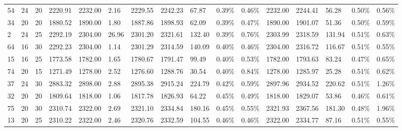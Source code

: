 \begin{longtable}{l|ll|lll|lllll|lllll}
   54 & 24                         & 20                         & 2220.91                   & 2232.00     & 2.16                & 2229.55 & 2242.23 & 67.87  & 0.39\%  & 0.46\% & 2232.00 & 2244.41 & 56.28  & 0.50\%  & 0.56\% \\
   34 & 20                         & 20                         & 1880.52                   & 1890.00     & 1.80                & 1887.86 & 1898.93 & 62.09  & 0.39\%  & 0.47\% & 1890.00 & 1901.07 & 51.36  & 0.50\%  & 0.59\% \\
   2  & 24                         & 25                         & 2292.19                   & 2304.00     & 26.96               & 2301.20 & 2321.61 & 132.40 & 0.39\%  & 0.76\% & 2303.99 & 2318.59 & 131.94 & 0.51\%  & 0.63\% \\
   64 & 16                         & 30                         & 2292.23                   & 2304.00     & 1.14                & 2301.29 & 2314.59 & 140.09 & 0.40\%  & 0.46\% & 2304.00 & 2316.72 & 116.67 & 0.51\%  & 0.55\% \\
   15 & 16                         & 25                         & 1773.58                   & 1782.00     & 1.65                & 1780.67 & 1791.47 & 99.49  & 0.40\%  & 0.53\% & 1782.00 & 1793.63 & 83.24  & 0.47\%  & 0.65\% \\
   74 & 20                         & 15                         & 1271.49                   & 1278.00     & 2.52                & 1276.60 & 1288.76 & 30.54  & 0.40\%  & 0.84\% & 1278.00 & 1285.97 & 25.28  & 0.51\%  & 0.62\% \\
   37 & 24                         & 30                         & 2883.32                   & 2898.00     & 2.88                & 2895.38 & 2915.24 & 224.79 & 0.42\%  & 0.59\% & 2897.96 & 2934.52 & 220.62 & 0.51\%  & 1.26\% \\
   32 & 20                         & 20                         & 1809.64                   & 1818.00     & 1.06                & 1817.78 & 1826.93 & 64.22  & 0.45\%  & 0.49\% & 1818.00 & 1829.07 & 53.86  & 0.46\%  & 0.61\% \\
   75 & 20                         & 30                         & 2310.74                   & 2322.00     & 2.69                & 2321.10 & 2334.84 & 180.16 & 0.45\%  & 0.55\% & 2321.93 & 2367.56 & 181.30 & 0.48\%  & 1.96\% \\
   13 & 20                         & 25                         & 2310.22                   & 2322.00     & 2.46                & 2320.76 & 2332.59 & 104.55 & 0.46\%  & 0.46\% & 2322.00 & 2334.77 & 87.16  & 0.51\%  & 0.55\% \\

\end{longtable}
